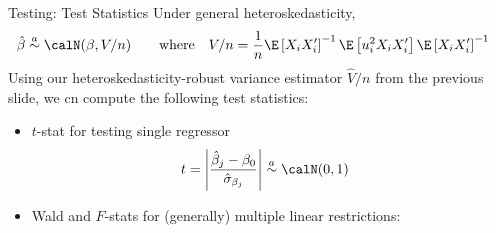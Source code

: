 \documentclass[aspectratio=169, handout]{beamer}
\newcommand*{\Chi}{\mbox{\large$\chi$}} %
\begin{document}
{\scriptsize
\begin{frame}{Testing: Test Statistics}
Under general heteroskedasticity,
\begin{align*}
  \hat{\beta}
  &\overset{a}{\sim}
  \calN(\beta,V/n)
  \qquad\text{where}\quad
  V/n
  =
  \frac{1}{n}
  \E\left[
  X_iX_i'
  \right]^{-1}
  \E
  \left[
  u_i^2
  X_iX_i'
  \right]
  \E\left[
  X_iX_i'
  \right]^{-1}
\end{align*}
Using our heteroskedasticity-robust variance estimator $\hat{V}/n$ from
the previous slide, we cn compute the following test statistics:
\begin{itemize}
  \item \alert{$t$-stat} for testing single regressor
    \begin{align*}
      t =
      \left\lvert\frac{\hat{\beta}_j -\beta_0}{\hat{\sigma}_{\beta_j}}\right\rvert
      &\overset{a}{\sim}
      \calN(0,1)
    \end{align*}
  \item
    \alert{Wald} and $F$-stats for (generally) multiple linear
    restrictions:
\end{itemize}
\end{frame}
}
\end{document}
